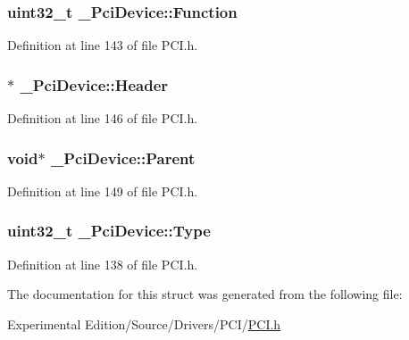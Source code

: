 \subsubsection[{\texorpdfstring{Function}{Function}}]{\setlength{\rightskip}{0pt plus 5cm}uint32\+\_\+t \+\_\+\+Pci\+Device\+::\+Function}\hypertarget{struct__PciDevice_ac8b9939eac2f6edaf3372d22871554e7}{}\label{struct__PciDevice_ac8b9939eac2f6edaf3372d22871554e7}


Definition at line 143 of file P\+C\+I.\+h.

\subsubsection[{\texorpdfstring{Header}{Header}}]{$\ast$ \+\_\+\+Pci\+Device\+::\+Header}\hypertarget{struct__PciDevice_a308d9d7234decbd3802735bf0a83e156}{}\label{struct__PciDevice_a308d9d7234decbd3802735bf0a83e156}


Definition at line 146 of file P\+C\+I.\+h.

\subsubsection[{\texorpdfstring{Parent}{Parent}}]{\setlength{\rightskip}{0pt plus 5cm}void$\ast$ \+\_\+\+Pci\+Device\+::\+Parent}\hypertarget{struct__PciDevice_ac46c4ff9140c0d3c4609f3cf53cea0e6}{}\label{struct__PciDevice_ac46c4ff9140c0d3c4609f3cf53cea0e6}


Definition at line 149 of file P\+C\+I.\+h.

\subsubsection[{\texorpdfstring{Type}{Type}}]{\setlength{\rightskip}{0pt plus 5cm}uint32\+\_\+t \+\_\+\+Pci\+Device\+::\+Type}\hypertarget{struct__PciDevice_a57d861d58ee386f1fe1d8820c1e409c5}{}\label{struct__PciDevice_a57d861d58ee386f1fe1d8820c1e409c5}


Definition at line 138 of file P\+C\+I.\+h.



The documentation for this struct was generated from the following file\+:\begin{DoxyCompactItemize}
\item 
Experimental Edition/\+Source/\+Drivers/\+P\+C\+I/\hyperlink{PCI_8h}{P\+C\+I.\+h}\end{DoxyCompactItemize}
